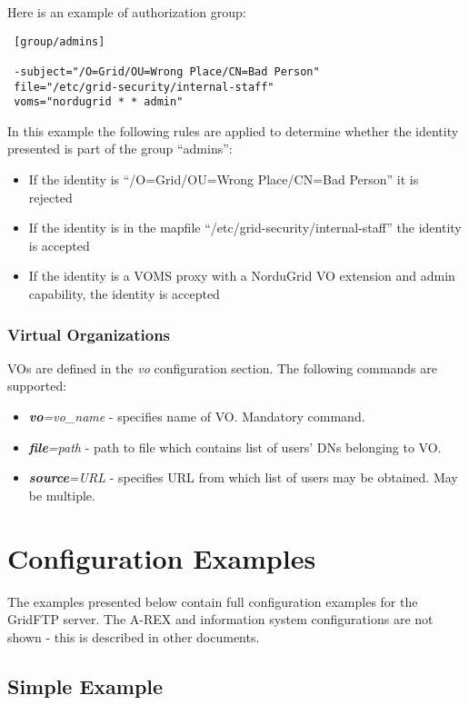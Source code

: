 \documentclass{article}
\begin{document}
Here is an example of authorization group:

\begin{verbatim}
 [group/admins]

 -subject="/O=Grid/OU=Wrong Place/CN=Bad Person"
 file="/etc/grid-security/internal-staff"
 voms="nordugrid * * admin"
\end{verbatim}

In this example the following rules are applied to determine whether
the identity presented is part of the group ``admins'':

\begin{itemize}
\item If the identity is ``/O=Grid/OU=Wrong Place/CN=Bad Person'' it
  is rejected
\item If the identity is in the mapfile
  ``/etc/grid-security/internal-staff'' the identity is accepted
\item If the identity is a VOMS proxy with a NorduGrid VO extension
  and admin capability, the identity is accepted
\end{itemize}

\subsubsection{Virtual Organizations}

VOs are defined in the \emph{vo} configuration section. The following
commands are supported:

\begin{itemize}
\item \textbf{\textit{vo}}\textit{=vo\_name} - specifies name of
  VO. Mandatory command.
\item \textbf{\textit{file}}\textit{=path} - path to file which
  contains list of users' DNs belonging to VO.
\item \textbf{\textit{source}}\textit{=URL} - specifies URL from which
  list of users may be obtained. May be multiple.
\end{itemize}


\section{Configuration Examples}

The examples presented below contain full configuration examples for
the GridFTP server. The A-REX and information system configurations
are not shown - this is described in other documents.


\subsection{Simple Example}
\end{document}
